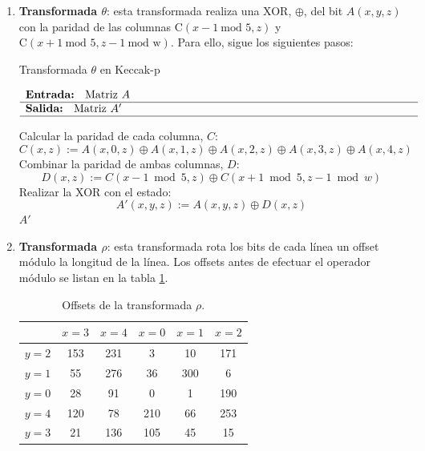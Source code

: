\begin{enumerate}
	\item \textbf{Transformada \(\theta\)}: esta transformada realiza una XOR, $\oplus$, del bit \(A(x,y,z)\) con la paridad de las columnas \(\text{C}(x-1 \ \text{mod } 5,z)\) y $\text{C}(x+1 \ \text{mod } 5,z-1 \ \text{mod w} )$. Para ello, sigue los siguientes pasos:
	\newpage
	\begin{algorithm}[H]
		\caption{Transformada \(\theta\) en Keccak-p}
		$\begin{array}{p{\textwidth}}
			\textbf{Entrada: } Matriz \(A\) \\ 
			\hline
			\textbf{Salida: } Matriz \(A'\) \\ 
			\hline
		\end{array}$
		\begin{algorithmic}[1]
			\State Calcular la paridad de cada columna, \(C\):
			\begin{equation}
				C(x,z):=A(x,0,z) \oplus A(x,1,z) \oplus A(x,2,z) \oplus A(x,3,z) \oplus A(x,4,z) 
			\end{equation}
			\State Combinar la paridad de ambas columnas, \(D\):
			\begin{equation}
				D(x,z):=C(x-1 \bmod 5,z) \oplus C(x+1 \bmod 5,z-1 \bmod w)
			\end{equation}
			\State Realizar la XOR con el estado:
			\begin{equation}
				A'(x,y,z):=A(x,y,z)\oplus D(x,z)
			\end{equation}
			\State \Return \(A'\)
		\end{algorithmic}
	\end{algorithm}
	\item \textbf{Transformada \(\rho\)}: esta transformada rota los bits de cada línea un offset módulo la longitud de la línea. Los offsets antes de efectuar el operador módulo se listan en la tabla \ref{tab:rhooffsets}.
	
	\begin{table}[H]
		\centering
		\begin{tabular}{|c|c|c|c|c|c|}
			\hline
			& $x = 3$ & $x = 4$ & $x = 0$ & $x = 1$ & $x = 2$ \\
			\hline
			$y = 2$ & 153 & 231 & 3 & 10 & 171 \\
			\hline
			$y = 1$ & 55 & 276 & 36 & 300 & 6 \\
			\hline
			$y = 0$ & 28 & 91 & 0 & 1 & 190 \\
			\hline
			$y = 4$ & 120 & 78 & 210 & 66 & 253 \\
			\hline
			$y = 3$ & 21 & 136 & 105 & 45 & 15 \\
			\hline
		\end{tabular}
		\caption{Offsets de la transformada $\rho$.}
		\label{tab:rhooffsets}
	\end{table}
	

\end{enumerate}
